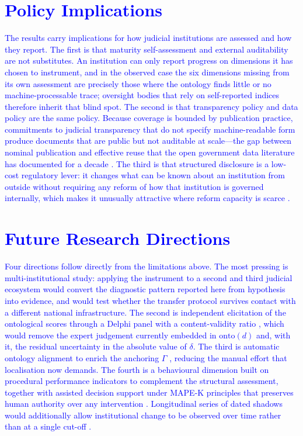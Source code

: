 \documentclass[engproc,proceedingpaper,submit,moreauthors]{Definitions/mdpi}
\begin{document}
\section{\textcolor{blue}{Policy Implications}}
\label{sec:policy}

    \textcolor{blue}{The results carry implications for how judicial institutions are assessed and how they report. The first is that maturity self-assessment and external auditability are not substitutes. An institution can only report progress on dimensions it has chosen to instrument, and in the observed case the six dimensions missing from its own assessment are precisely those where the ontology finds little or no machine-processable trace; oversight bodies that rely on self-reported indices therefore inherit that blind spot. The second is that transparency policy and data policy are the same policy. Because coverage is bounded by publication practice, commitments to judicial transparency that do not specify machine-readable form produce documents that are public but not auditable at scale---the gap between nominal publication and effective reuse that the open government data literature has documented for a decade \cite{Janssen2012,Attard2015}. The third is that structured disclosure is a low-cost regulatory lever: it changes what can be known about an institution from outside without requiring any reform of how that institution is governed internally, which makes it unusually attractive where reform capacity is scarce \cite{Li2024HFTP}.}

\section{\textcolor{blue}{Future Research Directions}}
\label{sec:future}

    \textcolor{blue}{Four directions follow directly from the limitations above. The most pressing is multi-institutional study: applying the instrument to a second and third judicial ecosystem would convert the diagnostic pattern reported here from hypothesis into evidence, and would test whether the transfer protocol survives contact with a different national infrastructure. The second is independent elicitation of the ontological scores through a Delphi panel with a content-validity ratio \cite{Lawshe1975}, which would remove the expert judgement currently embedded in $\mathrm{onto}(d)$ and, with it, the residual uncertainty in the absolute value of $\delta$. The third is automatic ontology alignment to enrich the anchoring $\Gamma$ \cite{Hogan2021}, reducing the manual effort that localisation now demands. The fourth is a behavioural dimension built on procedural performance indicators \cite{Medvedeva2020,Katz2017} to complement the structural assessment, together with assisted decision support under MAPE-K principles that preserves human authority over any intervention \cite{Kephart2003}. Longitudinal series of dated shadows would additionally allow institutional change to be observed over time rather than at a single cut-off \cite{Shahat2021,Haraguchi2024}.}
\end{document}
